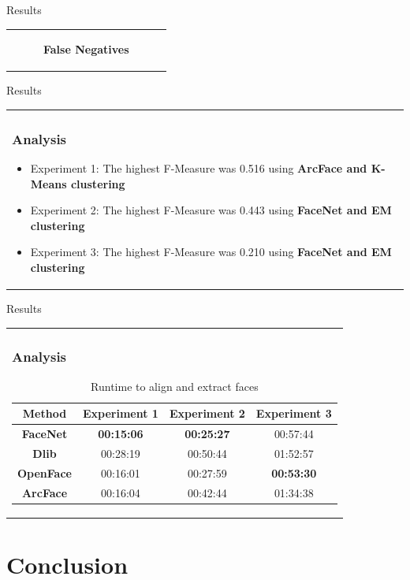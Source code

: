 \documentclass[11pt]{beamer}
\begin{document}
\begin{frame}{Results}
\begin{tabular}{l}
{\begin{figure}[H]
\begin{minipage}[b]{0.4\textwidth}
    \caption{\textbf{False Negatives}}
    \label{fig:ex2fn}
  \end{minipage}
\end{figure}

}
\end{tabular}  
\end{frame}

\begin{frame}{Results}
\begin{tabular}{l}
\parbox{1\linewidth}{
\frametitle{Analysis}
\begin{itemize}
\item Experiment 1: The highest F-Measure was 0.516 using \textbf{ArcFace and K-Means clustering}
\item Experiment 2: The highest F-Measure was 0.443 using \textbf{FaceNet and EM clustering}
\item Experiment 3: The highest F-Measure was 0.210 using \textbf{FaceNet and EM clustering}
\end{itemize}

}
\end{tabular}  
\end{frame}

\begin{frame}{Results}
\begin{tabular}{l}
\parbox{1\linewidth}{
\frametitle{Analysis}
\begin{table}[h!]
\centering
\begin{tabular}{||c c c c||} 
 \hline
Method & Experiment 1 & Experiment 2 & Experiment 3\\ [0.5ex]
 \hline\hline
 \textbf{FaceNet} & \textbf{00:15:06} & \textbf{00:25:27} & 00:57:44\\ 
 \hline
  \textbf{Dlib} & 00:28:19 & 00:50:44 & 01:52:57\\
 \hline
 \textbf{OpenFace} & 00:16:01 & 00:27:59 & \textbf{00:53:30}\\
 \hline
 \textbf{ArcFace} & 00:16:04 & 00:42:44 & 01:34:38\\
 \hline
\end{tabular}
\caption{Runtime to align and extract faces}
\label{table:runtime}
\end{table}

}
\end{tabular}  
\end{frame}

\section{Conclusion}
\end{document}
